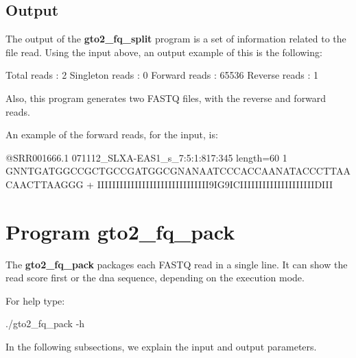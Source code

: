 \documentclass[11pt,]{krantz}
\newenvironment{Shaded}{\begin{snugshade}}{\end{snugshade}}
\newcommand{\ExtensionTok}[1]{#1}
\newcommand{\NormalTok}[1]{#1}
\begin{document}
\subsection*{Output}\label{output-11}


The output of the \textbf{gto2\_fq\_split} program is a set of
information related to the file read. Using the input above, an output
example of this is the following:

\begin{Shaded}
\begin{Highlighting}[]
\ExtensionTok{Total}\NormalTok{ reads     : 2}
\ExtensionTok{Singleton}\NormalTok{ reads : 0}
\ExtensionTok{Forward}\NormalTok{ reads   : 65536}
\ExtensionTok{Reverse}\NormalTok{ reads   : 1}
\end{Highlighting}
\end{Shaded}

Also, this program generates two FASTQ files, with the reverse and
forward reads.

An example of the forward reads, for the input, is:

\begin{Shaded}
\begin{Highlighting}[]
\ExtensionTok{@SRR001666.1}\NormalTok{ 071112_SLXA-EAS1_s_7:5:1:817:345 length=60 1}
\ExtensionTok{GNNTGATGGCCGCTGCCGATGGCGNANAATCCCACCAANATACCCTTAACAACTTAAGGG}
\ExtensionTok{+}
\ExtensionTok{IIIIIIIIIIIIIIIIIIIIIIIIIIIIII9IG9ICIIIIIIIIIIIIIIIIIIIIDIII}
\end{Highlighting}
\end{Shaded}

\section{Program gto2\_fq\_pack}\label{program-gto2_fq_pack}

The \textbf{gto2\_fq\_pack} packages each FASTQ read in a single line.
It can show the read score first or the dna sequence, depending on the
execution mode.

For help type:

\begin{Shaded}
\begin{Highlighting}[]
\ExtensionTok{./gto2_fq_pack}\NormalTok{ -h}
\end{Highlighting}
\end{Shaded}

In the following subsections, we explain the input and output
parameters.
\end{document}
